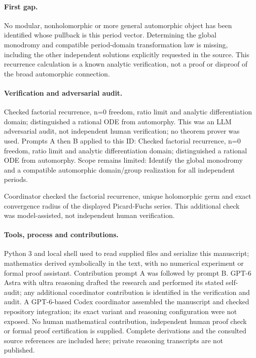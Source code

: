 \documentclass[11pt]{article}
\begin{document}
\paragraph{First gap.}No modular, nonholomorphic or more general automorphic object has been identified whose pullback is this period vector. Determining the global monodromy and compatible period-domain transformation law is missing, including the other independent solutions explicitly requested in the source. This recurrence calculation is a known analytic verification, not a proof or disproof of the broad automorphic connection.

\paragraph{Verification and adversarial audit.}
Checked factorial recurrence, n=0 freedom, ratio limit and analytic differentiation domain; distinguished a rational ODE from automorphy. This was an LLM adversarial audit, not independent human verification; no theorem prover was used. Prompts A then B applied to this ID: Checked factorial recurrence, n=0 freedom, ratio limit and analytic differentiation domain; distinguished a rational ODE from automorphy. Scope remains limited: Identify the global monodromy and a compatible automorphic domain/group realization for all independent periods.

Coordinator checked the factorial recurrence, unique holomorphic germ and exact convergence radius of the displayed Picard-Fuchs series. This additional check was model-assisted, not independent human verification.

\paragraph{Tools, process and contributions.}
Python 3 and local shell used to read supplied files and serialize this manuscript; mathematics derived symbolically in the text, with no numerical experiment or formal proof assistant. Contribution prompt A was followed by prompt B. GPT-6 Astra with ultra reasoning drafted the research and performed its stated self-audit; any additional coordinator contribution is identified in the verification and audit. A GPT-6-based Codex coordinator assembled the manuscript and checked repository integration; its exact variant and reasoning configuration were not exposed. No human mathematical contribution, independent human proof check or formal proof certification is supplied. Complete derivations and the consulted source references are included here; private reasoning transcripts are not published.
\end{document}
